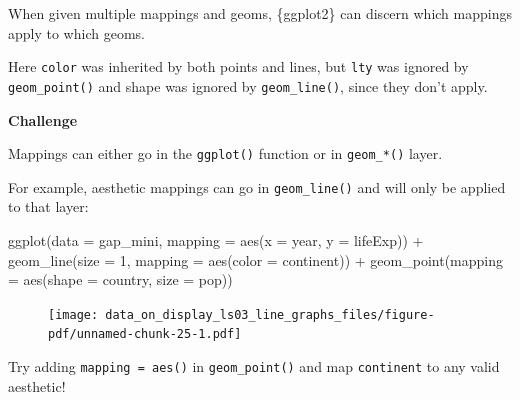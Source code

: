 \documentclass[
  letterpaper,
  DIV=11,
  numbers=noendperiod]{scrreprt}
\newenvironment{Shaded}{\begin{snugshade}}{\end{snugshade}}
\newcommand{\AttributeTok}[1]{\textcolor[rgb]{0.40,0.45,0.13}{#1}}
\newcommand{\DecValTok}[1]{\textcolor[rgb]{0.68,0.00,0.00}{#1}}
\newcommand{\FunctionTok}[1]{\textcolor[rgb]{0.28,0.35,0.67}{#1}}
\newcommand{\NormalTok}[1]{\textcolor[rgb]{0.00,0.23,0.31}{#1}}
\newcommand{\SpecialCharTok}[1]{\textcolor[rgb]{0.37,0.37,0.37}{#1}}
\begin{document}
When given multiple mappings and geoms, \{ggplot2\} can discern which
mappings apply to which geoms.

Here \texttt{color} was inherited by both points and lines, but
\texttt{lty} was ignored by \texttt{geom\_point()} and shape was ignored
by \texttt{geom\_line()}, since they don't apply.

\begin{tcolorbox}[enhanced jigsaw, colframe=quarto-callout-note-color-frame, rightrule=.15mm, opacityback=0, breakable, coltitle=black, colbacktitle=quarto-callout-note-color!10!white, bottomrule=.15mm, leftrule=.75mm, toprule=.15mm, arc=.35mm, bottomtitle=1mm, colback=white, left=2mm, opacitybacktitle=0.6, titlerule=0mm, title=\textcolor{quarto-callout-note-color}{\faInfo}\hspace{0.5em}{Challenge}, toptitle=1mm]

\textbf{Challenge}

Mappings can either go in the \texttt{ggplot()} function or in
\texttt{geom\_*()} layer.

For example, aesthetic mappings can go in \texttt{geom\_line()} and will
only be applied to that layer:

\begin{Shaded}
\begin{Highlighting}[]
\FunctionTok{ggplot}\NormalTok{(}\AttributeTok{data =}\NormalTok{ gap\_mini, }
       \AttributeTok{mapping =} \FunctionTok{aes}\NormalTok{(}\AttributeTok{x =}\NormalTok{ year,}
                     \AttributeTok{y =}\NormalTok{ lifeExp)) }\SpecialCharTok{+}
  \FunctionTok{geom\_line}\NormalTok{(}\AttributeTok{size =} \DecValTok{1}\NormalTok{, }\AttributeTok{mapping =} \FunctionTok{aes}\NormalTok{(}\AttributeTok{color =}\NormalTok{ continent)) }\SpecialCharTok{+} 
  \FunctionTok{geom\_point}\NormalTok{(}\AttributeTok{mapping =} \FunctionTok{aes}\NormalTok{(}\AttributeTok{shape =}\NormalTok{ country, }
                                     \AttributeTok{size =}\NormalTok{ pop))}
\end{Highlighting}
\end{Shaded}

\begin{figure}[H]

{\centering \texttt{[image: data\_on\_display\_ls03\_line\_graphs\_files/figure-pdf/unnamed-chunk-25-1.pdf]}

}

\end{figure}

Try adding \texttt{mapping\ =\ aes()} in \texttt{geom\_point()} and map
\texttt{continent} to any valid aesthetic!

\end{tcolorbox}
\end{document}
